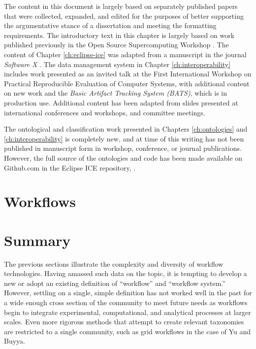 The content in this document is largely based on separately published papers
that were collected, expanded, and edited for the purposes of better supporting
the argumentative stance of a dissertation and meeting the formatting
requirements. The introductory text in this chapter is largely based on
work published previously in the Open Source Supercomputing Workshop
\cite{billings_toward_2017}. The content of Chapter \ref{ch:eclipse-ice} was
adapted from a manuscript in the journal \textit{Software X}
\cite{billings_eclipse_2018}. The data management system in Chapter
\ref{ch:interoperability} includes work presented as an invited talk at the
First International Workshop on Practical Reproducible Evaluation of Computer
Systems, with additional content on new work and the \textit{Basic Artifact
Tracking System (BATS)}, which is in production use. Additional content has
been adapted from slides presented at international conferences and workshops,
and committee meetings.

The ontological and classification work presented in Chapters
\ref{ch:ontologies} and \ref{ch:interoperability} is completely new, and at
time of this writing has not been published in manuscript form in
workshop, conference, or journal publications. However, the full source of the
ontologies and code has been made available on Github.com in the Eclipse ICE repository,
\cite{billings_ice_2019}.

\section{Workflows}


\section{Summary}

The previous sections illustrate the complexity and diversity of workflow
technologies. Having amassed such data on the topic, it is tempting to develop
a new or adopt an existing definition of ``workflow'' and ``workflow system.''
However, settling on a single, simple definition has not worked well in the past
for a wide enough cross section of the community to meet future needs as workflows
begin to integrate experimental, computational, and analytical processes at
larger scales. Even more rigorous methods that attempt to create relevant
taxonomies are restricted to a single community, such as grid workflows in the
case of Yu and Buyya.

